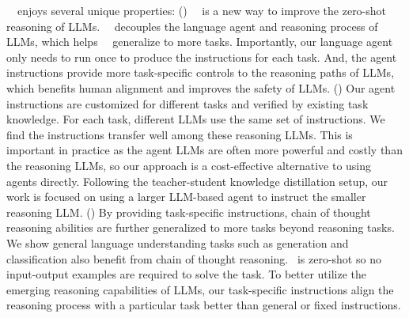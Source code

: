 \zeroshotstart\ \method\ enjoys several unique properties: (\expandafter{}) \zeroshotstart\ \method\ is a new way to improve the zero-shot reasoning of LLMs. \zeroshotstart\ \method\ decouples the language agent and reasoning process of LLMs, which helps \zeroshotmid\ \method\ generalize to more tasks. Importantly, our language agent only needs to run once to produce the instructions for each task. And, the agent instructions provide more task-specific controls to the reasoning paths of LLMs, which benefits human alignment and improves the safety of LLMs. (\expandafter{}) Our agent instructions are customized for different tasks and verified by existing task knowledge. For each task, different LLMs use the same set of instructions. We find the instructions transfer well among these reasoning LLMs. This is important in practice as the agent LLMs are often more powerful and costly than the reasoning LLMs, so our approach is a cost-effective alternative to using agents directly. Following the teacher-student knowledge distillation setup, our work is focused on using a larger LLM-based agent to instruct the smaller reasoning LLM.
(\expandafter{}) By providing task-specific instructions, chain of thought reasoning abilities are further generalized to more tasks beyond reasoning tasks. We show general language understanding tasks such as generation and classification also benefit from chain of thought reasoning. \method\ is zero-shot so no input-output examples are required to solve the task. To better utilize the emerging reasoning capabilities of LLMs, our task-specific instructions align the reasoning process with a particular task better than general or fixed instructions.